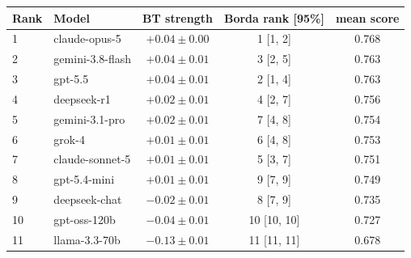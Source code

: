 \begin{tabular}{llccc}
\toprule
Rank & Model & BT strength & Borda rank [95\%] & mean score \\
\midrule
1 & claude-opus-5 & $+0.04 \pm 0.00$ & 1 [1, 2] & 0.768 \\
2 & gemini-3.8-flash & $+0.04 \pm 0.01$ & 3 [2, 5] & 0.763 \\
3 & gpt-5.5 & $+0.04 \pm 0.01$ & 2 [1, 4] & 0.763 \\
4 & deepseek-r1 & $+0.02 \pm 0.01$ & 4 [2, 7] & 0.756 \\
5 & gemini-3.1-pro & $+0.02 \pm 0.01$ & 7 [4, 8] & 0.754 \\
6 & grok-4 & $+0.01 \pm 0.01$ & 6 [4, 8] & 0.753 \\
7 & claude-sonnet-5 & $+0.01 \pm 0.01$ & 5 [3, 7] & 0.751 \\
8 & gpt-5.4-mini & $+0.01 \pm 0.01$ & 9 [7, 9] & 0.749 \\
9 & deepseek-chat & $-0.02 \pm 0.01$ & 8 [7, 9] & 0.735 \\
10 & gpt-oss-120b & $-0.04 \pm 0.01$ & 10 [10, 10] & 0.727 \\
11 & llama-3.3-70b & $-0.13 \pm 0.01$ & 11 [11, 11] & 0.678 \\
\bottomrule
\end{tabular}
